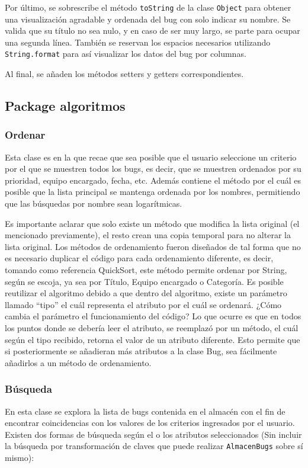 \documentclass[12pt,letterpaper]{article}
\begin{document}
Por último, se sobrescribe el método \texttt{toString} de la clase \texttt{Object} para obtener una visualización agradable y ordenada del bug con solo indicar su nombre. Se valida que su título no sea nulo, y en caso de ser muy largo, se parte para ocupar una segunda línea. También se reservan los espacios necesarios utilizando \texttt{String.format} para así visualizar los datos del bug por columnas.

Al final, se añaden los métodos setters y getters correspondientes.

\subsection{Package algoritmos}

\subsubsection*{Ordenar}
Esta clase es en la que recae que sea posible que el usuario seleccione un criterio por el que se muestren todos los bugs, es decir, que se muestren ordenados por su prioridad, equipo encargado, fecha, etc. Además contiene el método por el cuál es posible que la lista principal se mantenga ordenada por los nombres, permitiendo que las búsquedas por nombre sean logarítmicas.

Es importante aclarar que solo existe un método que modifica la lista original (el mencionado previamente), el resto crean una copia temporal para no alterar la lista original. Los métodos de ordenamiento fueron diseñados de tal forma que no es necesario duplicar el código para cada ordenamiento diferente, es decir, tomando como referencia QuickSort, este método permite ordenar por String, según se escoja, ya sea por Título, Equipo encargado o Categoría. Es posible reutilizar el algoritmo debido a que dentro del algoritmo, existe un parámetro llamado ``tipo'' el cuál representa el atributo por el cuál se ordenará. ¿Cómo cambia el parámetro el funcionamiento del código? Lo que ocurre es que en todos los puntos donde se debería leer el atributo, se reemplazó por un método, el cuál según el tipo recibido, retorna el valor de un atributo diferente. Esto permite que si posteriormente se añadieran más atributos a la clase Bug, sea fácilmente añadirlos a un método de ordenamiento.

\subsubsection*{Búsqueda}
En esta clase se explora la lista de bugs contenida en el almacén con el fin de encontrar coincidencias con los valores de los criterios ingresados por el usuario. Existen dos formas de búsqueda según el o los atributos seleccionados (Sin incluir la búsqueda por transformación de claves que puede realizar \texttt{AlmacenBugs} sobre sí mismo):
\end{document}
